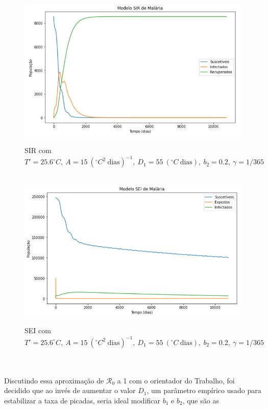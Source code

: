 \begin{figure}[!ht]
        \centering
        \hbox{\hspace{3.5em} \includegraphics[scale=0.6] {SIR_R0_near1.png}}
        \caption{SIR com $T'=25.6 ^\circ C, \ A=15 \ (^\circ C^2 \ \text{dias})^{-1}, \ D_1=55 \ (^\circ C \ \text{dias}), \ b_2=0.2, \ \gamma=1/365$}
\end{figure} 
\begin{figure}[!ht]
        \centering
        \hbox{\hspace{3.5em} \includegraphics[scale=0.6] {SEI_R0_near1.png}}
        \caption{SEI com $T'=25.6 ^\circ C, \ A=15 \ (^\circ C^2 \ \text{dias})^{-1}, \ D_1=55 \ (^\circ C \ \text{dias}), \ b_2=0.2, \ \gamma=1/365$}
\end{figure}
\\\\
Discutindo essa aproximação de $\mathcal{R}_0$ a 1 com o orientador do 
Trabalho, foi decidido 
que ao invés de aumentar o valor $D_1$, um parâmetro empírico usado para 
estabilizar a taxa de picadas, seria ideal modificar $b_1$ e $b_2$, que são as
